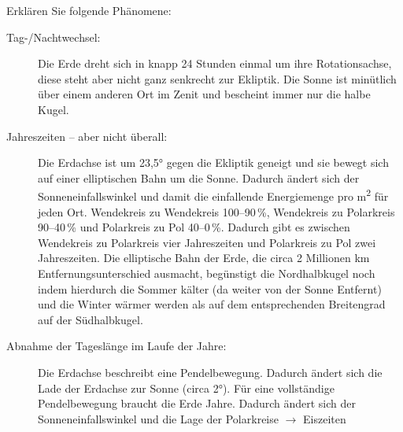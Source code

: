 Erklären Sie folgende Phänomene:
\begin{description}
	\item[Tag-/Nachtwechsel:] Die Erde dreht sich in knapp 24 Stunden einmal um ihre Rotationsachse,
	  diese steht aber nicht ganz senkrecht zur Ekliptik. Die Sonne ist minütlich
	  über einem anderen Ort im Zenit und bescheint immer nur die halbe Kugel.
	\item[Jahreszeiten -- aber nicht überall:] Die Erdachse ist um \ang{23,5} gegen die Ekliptik geneigt und
	  sie bewegt sich auf einer elliptischen
	  Bahn um die Sonne. Dadurch ändert sich der Sonneneinfallswinkel und damit die einfallende Energiemenge pro \si{\metre\squared}
	  für jeden Ort. Wendekreis zu Wendekreis 100--90\,\%, Wendekreis zu Polarkreis 90--40\,\% und
	  Polarkreis zu Pol 40--0\,\%. Dadurch gibt es zwischen Wendekreis zu Polarkreis vier Jahreszeiten und
	  Polarkreis zu Pol zwei Jahreszeiten. Die elliptische Bahn der Erde, die circa 2 Millionen \si{\kilo\metre}
	  Entfernungsunterschied ausmacht, begünstigt die Nordhalbkugel noch indem hierdurch die Sommer kälter
	  (da weiter von der Sonne Entfernt) und die Winter wärmer werden als auf dem entsprechenden Breitengrad auf der
	  Südhalbkugel.
	\item[Abnahme der Tageslänge im Laufe der Jahre:] Die Erdachse beschreibt eine Pendelbewegung.
	  Dadurch ändert sich die Lade der Erdachse zur Sonne (circa \ang{2}). Für eine vollständige Pendelbewegung
	  braucht die Erde  Jahre. Dadurch ändert sich der Sonneneinfallswinkel und
	  die Lage der Polarkreise $\rightarrow$ Eiszeiten
\end{description}

